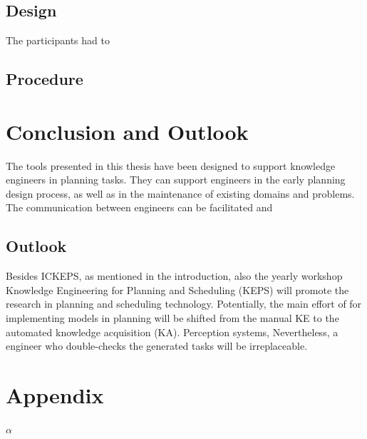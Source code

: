 \documentclass[11pt]{article}
\begin{document}
\subsection{Design}
\label{sec-5-3}

The participants had to 

\subsection{Procedure}
\label{sec-5-4}
\section{Conclusion and Outlook}
\label{sec-6}
The tools presented in this thesis have been designed to support
knowledge engineers in planning tasks. They can support engineers in
the early planning design process, as well as in the maintenance of
existing domains and problems. The communication between engineers can
be facilitated and 


\subsection{Outlook}
\label{sec-6-1}
Besides ICKEPS, as mentioned in the introduction, also the yearly
workshop Knowledge Engineering for Planning and Scheduling (KEPS) will
promote the research in planning and scheduling technology. Potentially, the main effort of
for implementing models in planning will be shifted from the manual KE
to the automated knowledge acquisition (KA). Perception systems,
Nevertheless, a engineer who double-checks the generated tasks will be
irreplaceable.  
\printbibliography

\section{Appendix}
\label{sec-7}
\(\alpha\)
\end{document}
